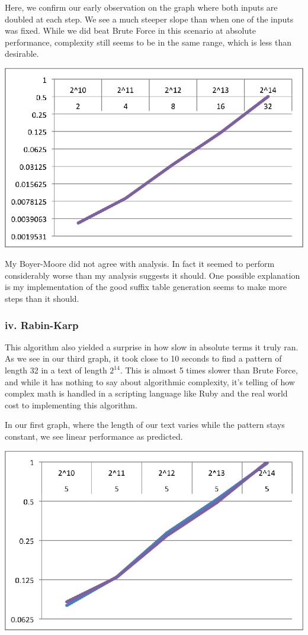 \documentclass{chi2005}
\begin{document}
Here, we confirm our early observation on the graph where both inputs are doubled at each step. We see a much steeper slope than when one of the inputs was fixed. While we did beat Brute Force in this scenario at absolute performance,  complexity still seems to be in the same range, which is less than desirable.

\includegraphics[scale=0.7]{BMVar.eps}

My Boyer-Moore did not agree with analysis. In fact it seemed to perform considerably worse than my analysis suggests it should. One possible explanation is my implementation of the good suffix table generation seems to make more steps than it should.

\subsubsection{iv. Rabin-Karp}

This algorithm also yielded a surprise in how slow in absolute terms it truly ran. As we see in our third graph, it took close to 10 seconds to find a pattern of length 32 in a text of length $2^14$. This is almost 5 times slower than Brute Force, and while it has nothing to say about algorithmic complexity, it's telling of how complex math is handled in a scripting language like Ruby and the real world cost to implementing this algorithm.

In our first graph, where the length of our text varies while the pattern stays constant, we see linear performance as predicted.

\includegraphics[scale=0.7]{RKFixedM.eps}
\end{document}
